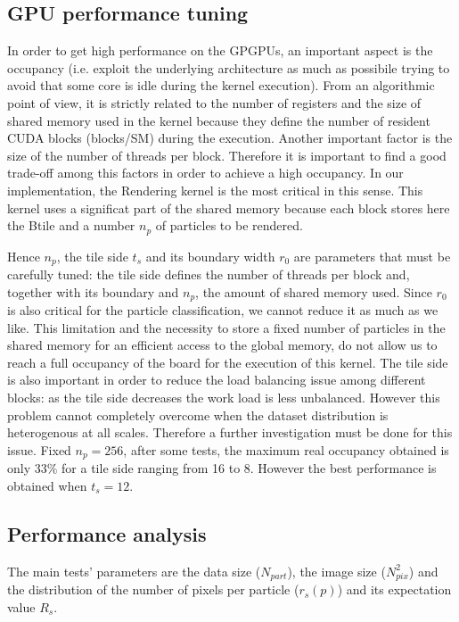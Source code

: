 \documentclass[11pt]{article}
\begin{document}
\subsection{GPU performance tuning}
\label{sec:gpuperf}
In order to get high performance on the GPGPUs, an important aspect is the occupancy (i.e. exploit the underlying architecture as much as possibile trying to avoid that some core is idle during the kernel execution).
From an algorithmic point of view, it is strictly related to the number of registers and the size of shared memory used in the kernel because they define the number of resident CUDA blocks (blocks/SM) during the execution. 
Another important factor is the size of the number of threads per block. Therefore it is important to find a good trade-off among this factors in order to achieve a high occupancy. In our implementation, the Rendering kernel is the most critical in this sense. This kernel uses a significat part of the shared memory because each block stores here the Btile and a number $n_p$ of particles to be rendered. 

Hence $n_p$, the tile side $t_s$ and its boundary width $r_0$ are parameters that must be carefully tuned:    
the tile side defines the number of threads per block and, together with its boundary and $n_p$, the amount of shared memory used.
Since $r_0$ is also critical for the particle classification, we cannot reduce it as much as we like. This limitation and the necessity to store a fixed number of particles in the shared memory for an efficient access to the global memory, do not allow us to reach a full occupancy of the board for the execution of this kernel. 
The tile side is also important in order to reduce the load balancing issue among different blocks: as the tile side decreases the work load is less unbalanced. However this problem cannot completely overcome when the dataset distribution is heterogenous at all scales. Therefore a further investigation must be done for this issue.
Fixed $n_p=256$, after some tests, the maximum real occupancy obtained is only $33\%$ for a tile side ranging from 16 to 8. However the best performance is obtained when $t_s = 12$.


\subsection{Performance analysis}
\label{sec:performance}

The main tests' parameters are the data size ($N_{part}$),
the image size ($N_{pix}^2$) and the distribution of the number of pixels 
per particle ($r_s(p)$) and its expectation value $R_s$.
\end{document}
